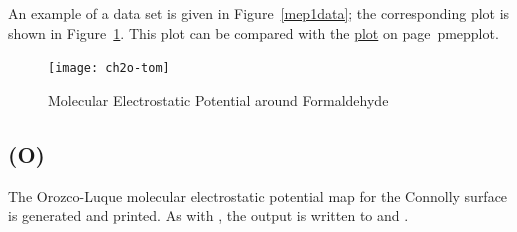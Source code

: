 An example of a  data set is given in Figure~\ref{mep1data}; the
corresponding plot is shown in Figure~\ref{mep1plot}.  This plot can be compared
with the \hyperref[pageref]{ plot}{ on page~}{}{pmepplot}.

\begin{figure}
\begin{makeimage}
\end{makeimage}
\begin{center}
\texttt{[image: ch2o-tom]}
\end{center}
\caption{\label{mep1plot} Molecular Electrostatic Potential around Formaldehyde}
\end{figure}

\subsection*{ (O)}
The Orozco-Luque molecular electrostatic potential map for the Connolly
surface is generated and printed.  As with , the output is
written to  and .

